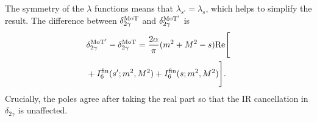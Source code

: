 The symmetry of the $\lambda$ functions means that $\lambda_{s'}=\lambda_s$, which helps to simplify the result.
The difference between $\delta_{2\gamma}^{\rm MoT}$ and $\delta_{2\gamma}^{\rm MoT'}$ is
\begin{eqnarray}
    &\delta_{2\gamma}^{\rm MoT'}-\delta_{2\gamma}^{\rm MoT} = \dfrac{2\alpha}\pi (m^2+M^2-s){\rm Re}\Bigg[\nonumber\\
            &+I_6^{\rm fin}(s';m^2,M^2) + I_6^{\rm fin}(s;m^2,M^2)\Bigg].
\end{eqnarray}
Crucially, the poles agree after taking the real part so that the IR cancellation in $\delta_{2\gamma}$ is unaffected.
